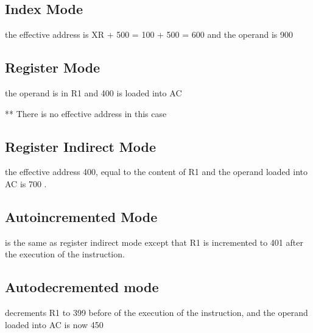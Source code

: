 \documentclass[12pt]{article}
\begin{document}
\subsection{Index Mode}
the effective address is XR + 500 = 100 + 500 = 600
and the operand is 900


\subsection{Register Mode}
the operand is in R1 and 400 is loaded into AC

** There is no effective address in this case


\subsection{Register Indirect Mode}
the effective address 400, equal to the content of R1 and the operand loaded into AC is 700 .

\subsection{Autoincremented Mode}
is the same as register indirect mode except that R1 is incremented to 401 after the execution of the instruction.

\subsection{Autodecremented mode}
decrements R1 to 399 before of the execution of the instruction, and the operand loaded into AC is now 450
\end{document}
